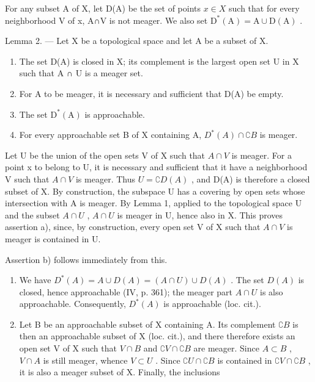 For any subset A of X, let D(A) be the set of points \(x \in X\) such that for every neighborhood V of x, A∩V is not meager. We also set \(\mathrm{D}^{*}(\mathrm{A}) = \mathrm{A} \cup \mathrm{D}(\mathrm{A})\) .

Lemma 2. --- Let X be a topological space and let A be a subset of X.

\begin{enumerate}
\def\labelenumi{\alph{enumi})}
\item
  The set D(A) is closed in X; its complement is the largest open set U in X such that A ∩ U is a meager set.
\item
  For A to be meager, it is necessary and sufficient that D(A) be empty.
\item
  The set \(\mathrm{D}^{*}(\mathrm{A})\) is approachable.
\item
  For every approachable set B of X containing A, \(D^{*}(A) \cap \complement B\) is meager.
\end{enumerate}

Let U be the union of the open sets V of X such that \(A \cap V\) is meager. For a point x to belong to U, it is necessary and sufficient that it have a neighborhood V such that \(A \cap V\) is meager. Thus \(U = \complement D(A)\) , and D(A) is therefore a closed subset of X. By construction, the subspace U has a covering by open sets whose intersection with A is meager. By Lemma 1, applied to the topological space U and the subset \(A \cap U\) , \(A \cap U\) is meager in U, hence also in X. This proves assertion a), since, by construction, every open set V of X such that \(A \cap V\) is meager is contained in U.

Assertion b) follows immediately from this.

\begin{enumerate}
\def\labelenumi{\alph{enumi})}
\setcounter{enumi}{2}
\item
  We have \(D^{*}(A) = A \cup D(A) = (A \cap U) \cup D(A)\) . The set \(D(A)\) is closed, hence approachable (IV, p. 361); the meager part \(A \cap U\) is also approachable. Consequently, \(D^{*}(A)\) is approachable (loc. cit.).
\item
  Let B be an approachable subset of X containing A. Its complement \(\complement B\) is then an approachable subset of X (loc. cit.), and there therefore exists an open set V of X such that \(V \cap B\) and \(\complement V \cap \complement B\) are meager. Since \(A \subset B\) , \(V \cap A\) is still meager, whence \(V \subset U\) . Since \(\complement U \cap \complement B\) is contained in \(\complement V \cap \complement B\) , it is also a meager subset of X. Finally, the inclusions
\end{enumerate}

